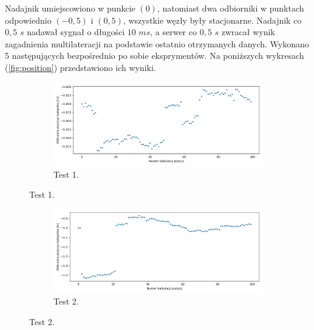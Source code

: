 Nadajnik umiejscowiono w punkcie $(0)$, natomiast dwa odbiorniki w punktach odpowiednio $(-0,5)$ i $(0,5)$, wszystkie węzły były stacjonarne. Nadajnik co $0,5$ $s$ nadawał sygnał o długości $10$ $ms$, a serwer co $0,5$ $s$ zwracał wynik zagadnienia multilateracji na podstawie ostatnio otrzymanych danych. Wykonano 5 następujących bezpośrednio po sobie eksprymentów. Na poniższych wykresach (\ref{fig:position}) przedstawiono ich wyniki.

\begin{figure}[H]
    \centering
    \begin{subfigure}{\textwidth}\label{fig:position_0}
        \centering
        \includegraphics[width=0.95\linewidth]{pics/position/position_0.png}
        \caption{Test 1.}
    \end{subfigure}
\end{figure}
\begin{figure}[H]
    \ContinuedFloat\centering
    \begin{subfigure}{\textwidth}\label{fig:position_1}
        \centering
        \includegraphics[width=0.95\linewidth]{pics/position/position_1.png}
        \caption{Test 2.}
    \end{subfigure}
\end{figure}
